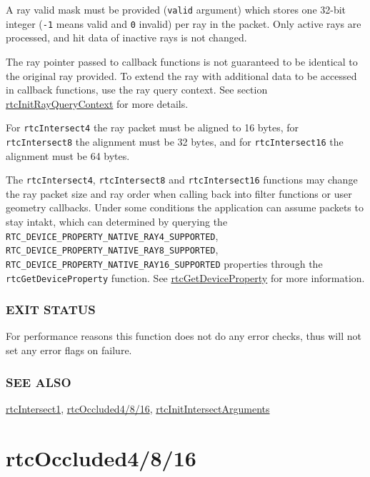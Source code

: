 A ray valid mask must be provided (\texttt{valid} argument) which stores
one 32-bit integer (\texttt{-1} means valid and \texttt{0} invalid) per
ray in the packet. Only active rays are processed, and hit data of
inactive rays is not changed.

The ray pointer passed to callback functions is not guaranteed to be
identical to the original ray provided. To extend the ray with
additional data to be accessed in callback functions, use the ray query
context. See section
\hyperref[rtcinitrayquerycontext]{rtcInitRayQueryContext} for more
details.

For \texttt{rtcIntersect4} the ray packet must be aligned to 16 bytes,
for \texttt{rtcIntersect8} the alignment must be 32 bytes, and for
\texttt{rtcIntersect16} the alignment must be 64 bytes.

The \texttt{rtcIntersect4}, \texttt{rtcIntersect8} and
\texttt{rtcIntersect16} functions may change the ray packet size and ray
order when calling back into filter functions or user geometry
callbacks. Under some conditions the application can assume packets to
stay intakt, which can determined by querying the
\texttt{RTC\_DEVICE\_PROPERTY\_NATIVE\_RAY4\_SUPPORTED},
\texttt{RTC\_DEVICE\_PROPERTY\_NATIVE\_RAY8\_SUPPORTED},
\texttt{RTC\_DEVICE\_PROPERTY\_NATIVE\_RAY16\_SUPPORTED} properties
through the \texttt{rtcGetDeviceProperty} function. See
\hyperref[rtcgetdeviceproperty]{rtcGetDeviceProperty} for more
information.

\subsubsection{EXIT STATUS}\label{exit-status}

For performance reasons this function does not do any error checks, thus
will not set any error flags on failure.

\subsubsection{SEE ALSO}\label{see-also}

\hyperref[rtcintersect1]{rtcIntersect1},
\hyperref[rtcoccluded4816]{rtcOccluded4/8/16},
\hyperref[rtcinitintersectarguments]{rtcInitIntersectArguments}

\pagebreak

\section{rtcOccluded4/8/16}\label{rtcoccluded4816}

